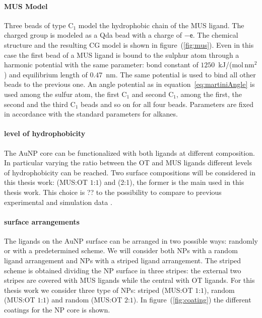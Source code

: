 \paragraph{\textbf{MUS Model}} Three \martini beads of type C$_1$ model the hydrophobic chain of the \ac{MUS} 
ligand. The charged group is modeled as a Qda bead with a charge of $-\mathsf{e}$. The chemical structure and the 
resulting \ac{CG} \martini model is shown in figure~(\ref{fig:mus}). Even in this case the first bead of a 
\ac{MUS} ligand is bound to the sulphur atom through a harmonic potential with the same parameter: bond constant 
of $1250$~kJ/(mol\,nm$^2$) and equilibrium length of $0.47$~nm. The same potential is used to bind all other beads 
to the previous one. An angle potential as in equation~\eqref{eq:martiniAngle} is used among the sulfur atom, the 
first C$_1$ and second C$_1$, among the first, the second and the third C$_1$ beads and so on for all four beads. 
Parameters are fixed in accordance with the standard \martini parameters for alkanes.%

\paragraph{\textbf{level of hydrophobicity}} The \ac{AuNP} core can be functionalized with both ligands at 
different composition. In particular varying the ratio between the \ac{OT} and \ac{MUS} ligands different levels 
of hydrophobicity can be reached. Two surface compositions will be considered in this thesis work: 
(\ac{MUS}:\ac{OT} $1$:$1$) and (2:1), the former is the main used in this thesis work. This choice is ?? to the 
possibility to compare to previous experimental and simulation data \cite{experimentMaccarini}.

\paragraph{\textbf{surface arrangements}} The ligands on the \ac{AuNP} surface can be arranged in two possible 
ways: randomly or with a predetermined scheme. We will consider both \acp{NP} with a random ligand arrangement and 
\acp{NP} with a striped ligand arrangement. The striped scheme is obtained dividing the \ac{NP} surface in three 
stripes: the external two stripes are covered with \ac{MUS} ligands while the central with \ac{OT} ligands. For 
this thesis work we consider three type of \acp{NP}: striped (\ac{MUS}:\ac{OT} $1$:$1$), random (\ac{MUS}:\ac{OT} 
$1$:$1$) and random (\ac{MUS}:\ac{OT} $2$:$1$). In figure~(\ref{fig:coating}) the different coatings for the 
\ac{NP} core is shown.


